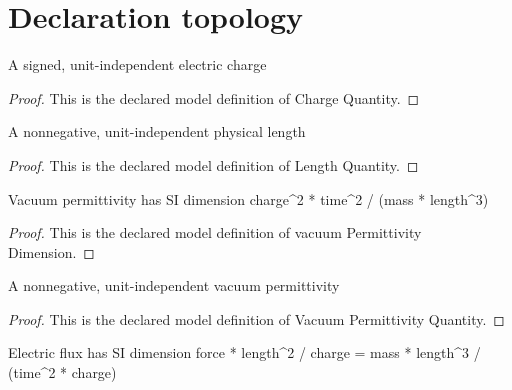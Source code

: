 \section{Declaration topology}
\begin{definition}
  \label{def:physics:phyx-mini-0847:phyxminiproblems-problemphyxmini0847-chargequantity}
  A signed, unit-independent electric charge
\end{definition}
\begin{proof}
  This is the declared model definition of Charge Quantity.
\end{proof}
\begin{definition}
  \label{def:physics:phyx-mini-0847:phyxminiproblems-problemphyxmini0847-lengthquantity}
  A nonnegative, unit-independent physical length
\end{definition}
\begin{proof}
  This is the declared model definition of Length Quantity.
\end{proof}
\begin{definition}
  \label{def:physics:phyx-mini-0847:phyxminiproblems-problemphyxmini0847-vacuumpermittivitydimension}
  Vacuum permittivity has SI dimension charge\textasciicircum{}2 * time\textasciicircum{}2 / (mass * length\textasciicircum{}3)
\end{definition}
\begin{proof}
  This is the declared model definition of vacuum Permittivity Dimension.
\end{proof}
\begin{definition}
  \label{def:physics:phyx-mini-0847:phyxminiproblems-problemphyxmini0847-vacuumpermittivityquantity}
  A nonnegative, unit-independent vacuum permittivity
\end{definition}
\begin{proof}
  This is the declared model definition of Vacuum Permittivity Quantity.
\end{proof}
\begin{definition}
  \label{def:physics:phyx-mini-0847:phyxminiproblems-problemphyxmini0847-electricfluxdimension}
  Electric flux has SI dimension force * length\textasciicircum{}2 / charge = mass * length\textasciicircum{}3 / (time\textasciicircum{}2 * charge)
\end{definition}
